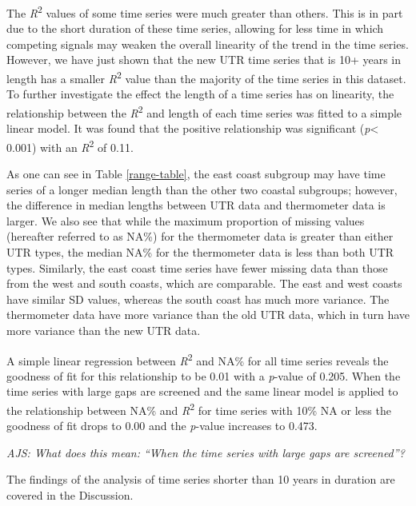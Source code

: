 \documentclass{ametsoc}
\begin{document}
The \emph{R}\textsuperscript{2} values of some time series were much greater than others. This is in part due to the short duration of these time series, allowing for less time in which competing signals may weaken the overall linearity of the trend in the time series. However, we have just shown that the new UTR time series that is 10+ years in length has a smaller \emph{R}\textsuperscript{2} value than the majority of the time series in this dataset. To further investigate the effect the length of a time series has on linearity, the relationship between the \emph{R}\textsuperscript{2} and length of each time series was fitted to a simple linear model. It was found that the positive relationship was significant (\emph{p}\num{< 0.001}) with an \emph{R}\textsuperscript{2} of 0.11.

As one can see in Table \ref{range-table}, the east coast subgroup may have time series of a longer median length than the other two coastal subgroups; however, the difference in median lengths between UTR data and thermometer data is larger. We also see that while the maximum proportion of missing values (hereafter referred to as NA\%) for the thermometer data is greater than either UTR types, the median NA\% for the thermometer data is less than both UTR types. Similarly, the east coast time series have fewer missing data than those from the west and south coasts, which are comparable. The east and west coasts have similar SD values, whereas the south coast has much more variance. The thermometer data have more variance than the old UTR data, which in turn have more variance than the new UTR data.

A simple linear regression between \emph{R}\textsuperscript{2} and NA\% for all time series reveals the goodness of fit for this relationship to be 0.01 with a \emph{p}-value of 0.205. When the time series with large gaps are screened and the same linear model is applied to the relationship between NA\% and \emph{R}\textsuperscript{2} for time series with 10\% NA or less the goodness of fit drops to 0.00 and the \emph{p}-value increases to 0.473.

\emph{AJS: What does this mean: ``When the time series with large gaps are screened''?}

The findings of the analysis of time series shorter than 10 years in duration are covered in the Discussion.
\end{document}
